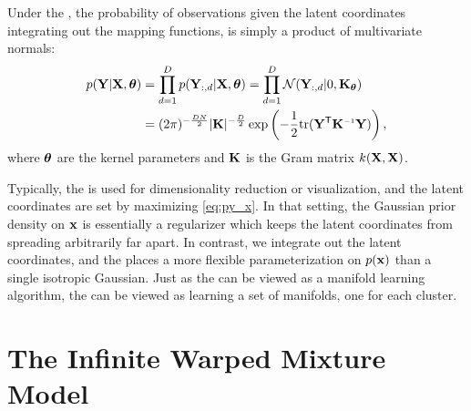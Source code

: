 Under the \gplvm{}, the probability of observations given the latent coordinates integrating out the mapping functions, is simply a product of multivariate normals:
\begin{align}
p(\vY | \vX, \vtheta) 
& = \prod_{d=1}^D p(\vY_{:,d} | \vX, \vtheta) = \prod_{d=1}^D \N{\vY_{:,d}}{0}{\vK_\vtheta} \\ 
& = (2 \pi)^{-\frac{DN}{2}}  |\vK|^{-\frac{D}{2}} \exp \left( -\frac{1}{2} {\rm tr}( \vY\tra \vK\inv \vY) \right),
\label{eq:py_x}
\end{align}
where ${\boldsymbol{\theta}}$ are the kernel parameters and $\mathbf{K}$ is the Gram matrix $k(\mathbf{X}, \mathbf{X})$.

Typically, the \gplvm{} is used for dimensionality reduction or visualization, and the latent coordinates are set by maximizing \eqref{eq:py_x}.
In that setting, the Gaussian prior density on ${\bf{x}}$ is essentially a regularizer which keeps the latent coordinates from spreading arbitrarily far apart.  
In contrast, we integrate out the latent coordinates, and the \iwmm{} places a more flexible parameterization on $p({\bf{x}})$ than a single isotropic Gaussian.
Just as the \gplvm{} can be viewed as a manifold learning algorithm, the \iwmm{} can be viewed as learning a set of manifolds, one for each cluster.





\section{The Infinite Warped Mixture Model}
\label{sec:iwmm-definition}

